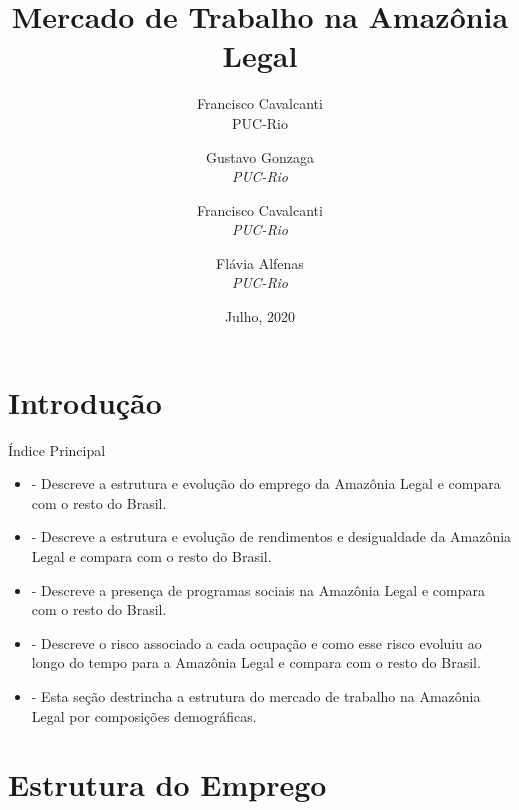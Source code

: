 \documentclass[11pt]{beamer}
\author[Francisco Cavalcanti]{Francisco Cavalcanti\\\footnotesize{PUC-Rio}
}
\author{
Gustavo Gonzaga \\
\textit{PUC-Rio}\\ \vspace{3mm}
\and  
Francisco Cavalcanti\\
\textit{PUC-Rio}\\ \vspace{3mm}
\and   
Flávia  Alfenas\\
\textit{PUC-Rio} 
}
\date{Julho, 2020}
\title{Mercado de Trabalho na Amazônia Legal}
\begin{document}

\begin{frame}
\titlepage
\end{frame}


\section{Introdução}

\begin{frame}[label=indice_principal]{Índice Principal}

\begin{itemize}
\item{
	\hyperlink{_estrutura_emprego}{} - Descreve a estrutura e evolução do emprego da Amazônia Legal e compara com o resto do Brasil.
	}   
		
\item{
	\hyperlink{_estrutura_renda}{} - Descreve a estrutura e evolução de rendimentos e desigualdade da Amazônia Legal e compara com o resto do Brasil.
	}  
	
\item{
	\hyperlink{_programas_sociais}{} - Descreve a presença de programas sociais na Amazônia Legal e compara com o resto do Brasil.
	}  
	
\item{
	\hyperlink{_transicao_ocupacao}{} - Descreve o risco associado a cada ocupação e como esse risco evoluiu ao longo do tempo para a Amazônia Legal e compara com o resto do Brasil.
	}  
	
\item{
	\hyperlink{_composicao_demografica}{} - Esta seção destrincha a estrutura do mercado de trabalho na Amazônia Legal por composições demográficas.
	}  

\end{itemize}

\end{frame}

\section{Estrutura do Emprego}
\end{document}
